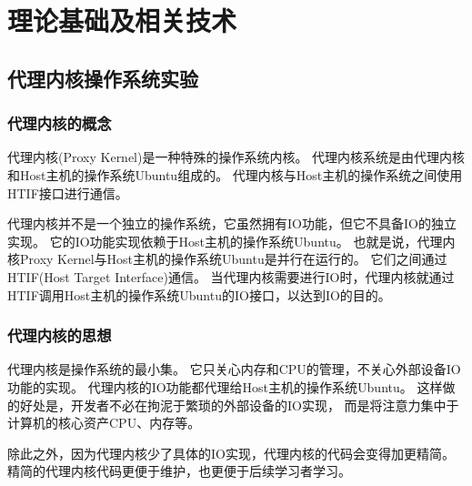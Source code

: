 %
%
%
%
%
%

\chapter{理论基础及相关技术}

\section{代理内核操作系统实验}

\subsection{代理内核的概念}

代理内核(Proxy Kernel)是一种特殊的操作系统内核。
代理内核系统是由代理内核和Host主机的操作系统Ubuntu组成的。
代理内核与Host主机的操作系统之间使用HTIF接口进行通信。

代理内核并不是一个独立的操作系统，它虽然拥有IO功能，但它不具备IO的独立实现。
它的IO功能实现依赖于Host主机的操作系统Ubuntu。
也就是说，代理内核Proxy Kernel与Host主机的操作系统Ubuntu是并行在运行的。
它们之间通过HTIF(Host Target Interface)通信。
当代理内核需要进行IO时，代理内核就通过HTIF调用Host主机的操作系统Ubuntu的IO接口，以达到IO的目的。

\subsection{代理内核的思想}

代理内核是操作系统的最小集。
它只关心内存和CPU的管理，不关心外部设备IO功能的实现。
代理内核的IO功能都代理给Host主机的操作系统Ubuntu。
这样做的好处是，开发者不必在拘泥于繁琐的外部设备的IO实现，
而是将注意力集中于计算机的核心资产CPU、内存等。

除此之外，因为代理内核少了具体的IO实现，代理内核的代码会变得加更精简。
精简的代理内核代码更便于维护，也更便于后续学习者学习。


